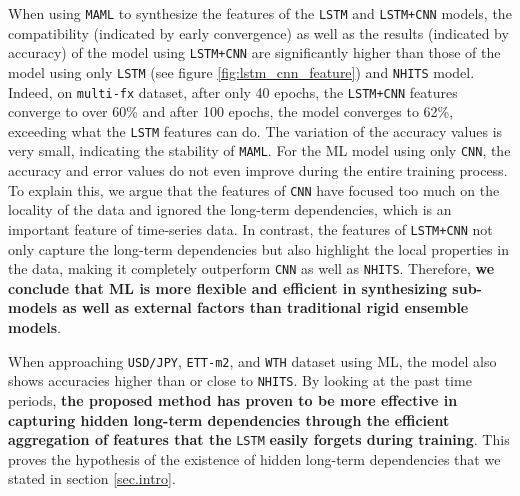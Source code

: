 \documentclass[aps,prb,groupedaddress,twocolumn,showpacs,dvipdfmx,superscriptaddress,pdftex]{revtex4-2}
\begin{document}
When using \verb|MAML| to synthesize the features of the \verb|LSTM| and \verb|LSTM+CNN| models, the compatibility (indicated by early convergence) as well as the results (indicated by accuracy) of the model using \verb|LSTM+CNN| are significantly higher than those of the model using only \verb|LSTM| (see figure \ref{fig:lstm_cnn_feature}) and \verb|NHITS| model. Indeed, on \verb|multi-fx| dataset, after only 40 epochs, the \verb|LSTM+CNN| features converge to over 60\% and after 100 epochs, the model converges to 62\%, exceeding what the \verb|LSTM| features can do. The variation of the accuracy values is very small, indicating the stability of \verb|MAML|. For the ML model using only \verb|CNN|, the accuracy and error values do not even improve during the entire training process. To explain this, we argue that the features of \verb|CNN| have focused too much on the locality of the data and ignored the long-term dependencies, which is an important feature of time-series data. In contrast, the features of \verb|LSTM+CNN| not only capture the long-term dependencies but also highlight the local properties in the data, making it completely outperform \verb|CNN| as well as \verb|NHITS|. Therefore, \textbf{we conclude that ML is more flexible and efficient in synthesizing sub-models as well as external factors than traditional rigid ensemble models}.

\vspace{2mm}


When approaching \verb|USD/JPY|, \verb|ETT-m2|, and \verb|WTH| dataset using ML, the model also shows accuracies higher than or close to \verb|NHITS|. By looking at the past time periods, \textbf{the proposed method has proven to be more effective in capturing hidden long-term dependencies through the efficient aggregation of features that the} \verb|LSTM| \textbf{easily forgets during training}. This proves the hypothesis of the existence of hidden long-term dependencies that we stated in section \ref{sec.intro}.

\vspace{2mm}
\end{document}
